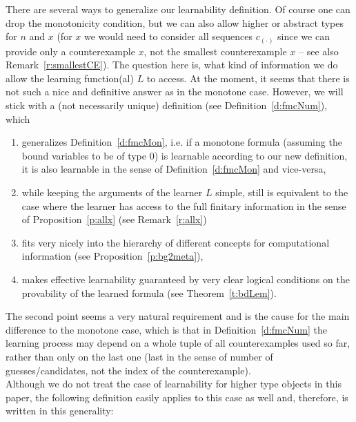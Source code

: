 \documentclass[1p]{elsarticle}
\theoremstyle{plain}
\theoremstyle{definition}
\theoremstyle{remark}
\theoremstyle{definition}
\begin{document}
There are several ways to generalize our learnability definition. 
Of course one can drop the monotonicity condition, but we can also allow higher or abstract types for $n$ and $x$ 
(for $x$ we would need to consider all sequences $c_{(\cdot)}$ since we can provide only a counterexample $x$, 
not the smallest counterexample $x$ -- see also Remark~\ref{r:smallestCE}). 
The question here is, what kind of information we do allow the learning function(al) $L$ to access. At the moment, it seems 
that there is not such a nice and definitive answer as in the monotone case. However, we will stick with a (not necessarily unique) definition (see Definition~\ref{d:fmcNum}), which
\begin{enumerate} 
\item generalizes Definition~\ref{d:fmcMon}, i.e. if a monotone formula (assuming the bound variables to be of type $0$) is learnable according to our new definition, it is also learnable in the sense of 
Definition~\ref{d:fmcMon} and vice-versa,
\item while keeping the arguments of the learner $L$ simple, still is equivalent to the case where the learner has access to the full finitary information in the sense of Proposition~\ref{p:allx} (see Remark~\ref{r:allx})
\item fits very nicely into the hierarchy of different concepts for computational information (see Proposition~\ref{p:bg2meta}),
\item makes effective learnability guaranteed by very clear logical conditions on the provability of the learned formula (see Theorem~\ref{t:bdLem}).
\end{enumerate} 
The second point seems a very natural requirement and is the cause for 
the main difference to the monotone case, which is that in Definition~\ref{d:fmcNum} the learning process may depend on a whole tuple of all counterexamples used so far, rather than only on the 
last one (last in the sense of number of guesses/candidates, not the index of the counterexample). 
\\[1mm] 
Although we do not treat the case of learnability for higher type objects 
in this paper, the following definition easily applies to this case as well 
and, therefore, is written in this generality:
\end{document}
